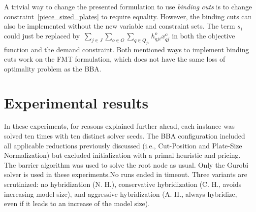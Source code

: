 \documentclass[ppgc,tese,english,formais,babel]{iiufrgs}
\begin{document}

A trivial way to change the presented formulation to use \emph{binding cuts} is to change constraint~\eqref{piece_sized_plates} to require equality.
However, the binding cuts can also be implemented without the new variable and constraint sets.
The term \(s_i\) could just be replaced by~\(\sum_{j \in J}\sum_{o \in O}\sum_{q \in Q_{jo}} h^o_{qji} x^o_{qj}\) in both the objective function and the demand constraint.
Both mentioned ways to implement binding cuts work on the FMT formulation, which does not have the same loss of optimality problem as the BBA.


\section{Experimental results}

In these experiments, for reasons explained further ahead, each instance was solved ten times with ten distinct solver seeds.
The BBA configuration included all applicable reductions previously discussed (i.e., Cut-Position and Plate-Size Normalization) but excluded initialization with a primal heuristic and pricing.
The barrier algorithm was used to solve the root node as usual.
Only the Gurobi solver is used in these experiments.No runs ended in timeout.
Three variants are scrutinized: no hybridization (N. H.), conservative hybridization (C. H., avoids increasing model size), and aggressive hybridization (A. H., always hybridize, even if it leads to an increase of the model size).
\end{document}
